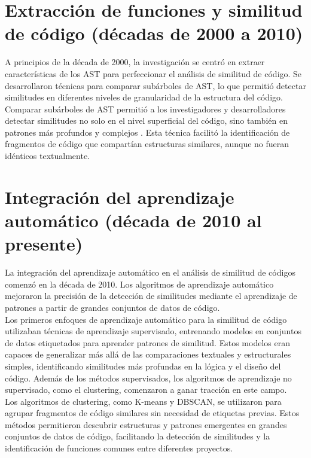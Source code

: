\section*{\textbf{Extracción de funciones y similitud de código (décadas de 2000 a 2010)}}
A principios de la década de 2000, la investigación se centró en extraer características de los AST para perfeccionar el análisis de similitud de código. Se desarrollaron técnicas para comparar subárboles de AST, lo que permitió detectar similitudes en diferentes niveles de granularidad de la estructura del código. \\

Comparar subárboles de AST permitió a los investigadores y desarrolladores detectar similitudes no solo en el nivel superficial del código, sino también en patrones más profundos y complejos \cite{kam2005analyzing}. Esta técnica facilitó la identificación de fragmentos de código que compartían estructuras similares, aunque no fueran idénticos textualmente. \\

\section*{\textbf{Integración del aprendizaje automático (década de 2010 al presente)}}
La integración del aprendizaje automático en el análisis de similitud de códigos comenzó en la década de 2010. Los algoritmos de aprendizaje automático mejoraron la precisión de la detección de similitudes mediante el aprendizaje de patrones a partir de grandes conjuntos de datos de código. \\

Los primeros enfoques de aprendizaje automático para la similitud de código utilizaban técnicas de aprendizaje supervisado, entrenando modelos en conjuntos de datos etiquetados para aprender patrones de similitud. Estos modelos eran capaces de generalizar más allá de las comparaciones textuales y estructurales simples, identificando similitudes más profundas en la lógica y el diseño del código. Además de los métodos supervisados, los algoritmos de aprendizaje no supervisado, como el clustering, comenzaron a ganar tracción en este campo. \\

Los algoritmos de clustering, como K-means y DBSCAN, se utilizaron para agrupar fragmentos de código similares sin necesidad de etiquetas previas. Estos métodos permitieron descubrir estructuras y patrones emergentes en grandes conjuntos de datos de código, facilitando la detección de similitudes y la identificación de funciones comunes entre diferentes proyectos. \\


